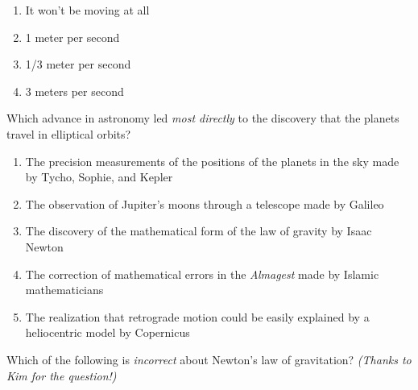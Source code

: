 \documentclass[12pt]{article}
\begin{document}
\begin{enumerate}
\begin{minipage}{\textwidth}
{\begin{enumerate}[label=(\Alph*)]
\setlength\itemsep{0.0em}
\item{ It won't be moving at all }
\item{ 1 meter per second }
\item{ 1/3 meter per second }
\item{ 3 meters per second }
\end{enumerate}
} %
\end{minipage}


\vspace{0.5in}

\begin{minipage}{\textwidth}
\item{Which advance in astronomy led {\it most directly} to the discovery that the planets travel in elliptical orbits?

\begin{enumerate}[label=(\Alph*)]
\setlength\itemsep{0.0em}
\item{ The precision measurements of the positions of the planets in the sky made by Tycho, Sophie, and Kepler }
\item{ The observation of Jupiter's moons through a telescope made by Galileo }
\item{ The discovery of the mathematical form of the law of gravity by Isaac Newton }
\item{ The correction of mathematical errors in the {\it Almagest} made by Islamic mathematicians }
\item{ The realization that retrograde motion could be easily explained by a heliocentric model by Copernicus }
\end{enumerate}
} %
\end{minipage}


\vspace{0.5in}

\begin{minipage}{\textwidth}
\item{Which of the following is {\it incorrect} about Newton's law of gravitation? {\it (Thanks to Kim for the question!)}

}
\end{minipage}
\end{enumerate}
\end{document}
